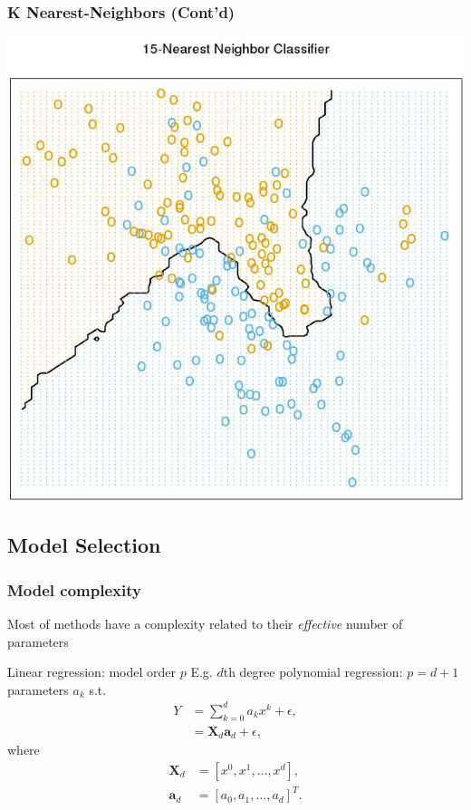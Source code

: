 \documentclass[compress, smaller, serif, 9pt]{beamer}
\begin{document}
\begin{frame}
  \frametitle{K Nearest-Neighbors (Cont'd)}
  \begin{center}
    \includegraphics[width=.6\textwidth]{ex_kpp_15.jpg}
  \end{center}
\end{frame}

\subsection{Model Selection}

\begin{frame}
  \frametitle{Model complexity}
  Most of methods have a complexity related to their {\it effective} number of parameters

  \begin{block}{Linear regression: model order $p$}
  E.g. $d$th degree polynomial regression: $p=d+1$ parameters $a_k$ s.t.
    \begin{align*}
       Y &= \sum_{k=0}^d a_k x^{k} + \epsilon,\\
       &= \boldsymbol{X}_d \boldsymbol{a}_d + \epsilon,
    \end{align*}
    where
    \begin{align*}
       \boldsymbol{X}_d &= \left[x^0, x^1, \ldots, x^d\right], \\
       \boldsymbol{a}_d &= \left[a_0, a_1, \ldots, a_d\right]^T.
    \end{align*}

  \end{block}
\end{frame}

\end{document}
